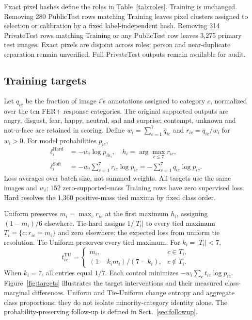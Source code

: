 Exact pixel hashes define the roles in Table~\ref{tab:roles}. Training is unchanged. Removing 280 PublicTest rows matching Training leaves pixel clusters assigned to selection or calibration by a fixed label-independent hash. Removing 314 PrivateTest rows matching Training or any PublicTest row leaves 3,275 primary test images. Exact pixels are disjoint across roles; person and near-duplicate separation remain unverified. Full PrivateTest outputs remain available for audit.


\subsection{Training targets}
Let $q_{ic}$ be the fraction of image $i$'s annotations assigned to category $c$, normalized over the ten FER+ response categories. The original supported outputs are angry, disgust, fear, happy, neutral, sad and surprise; contempt, unknown and not-a-face are retained in scoring. Define $w_i=\sum_{c=1}^{7}q_{ic}$ and $r_{ic}=q_{ic}/w_i$ for $w_i>0$. For model probabilities $p_{ic}$,
\begin{align}
\ell_i^{\mathrm{Hard}}&=-w_i\log p_{ih_i},\quad h_i=\arg\max_{c\leq7}r_{ic},\\
\ell_i^{\mathrm{Soft}}&=-w_i\sum_{c=1}^{7}r_{ic}\log p_{ic}
=-\sum_{c=1}^{7}q_{ic}\log p_{ic}.
\end{align}
Loss averages over batch size, not summed weights. All targets use the same images and $w_i$; 152 zero-supported-mass Training rows have zero supervised loss. Hard resolves the 1,360 positive-mass tied maxima by fixed class order.

Uniform preserves $m_i=\max_c r_{ic}$ at the first maximum $h_i$, assigning $(1-m_i)/6$ elsewhere. Tie-hard assigns $1/|T_i|$ to every tied maximum $T_i=\{c:r_{ic}=m_i\}$ and zero elsewhere: the expected loss from uniform tie resolution. Tie-Uniform preserves every tied maximum. For $k_i=|T_i|<7$,
\begin{equation}
t_{ic}^{\mathrm{TU}}=\begin{cases}m_i,&c\in T_i,\\(1-k_i m_i)/(7-k_i),&c\notin T_i.\end{cases}
\end{equation}
When $k_i=7$, all entries equal $1/7$. Each control minimizes $-w_i\sum_c t_{ic}\log p_{ic}$. Figure~\ref{fig:targets} illustrates the target interventions and their measured class-marginal differences. Uniform and Tie-Uniform change entropy and aggregate class proportions; they do not isolate minority-category identity alone. The probability-preserving follow-up is defined in Sect.~\ref{sec:followup}.

